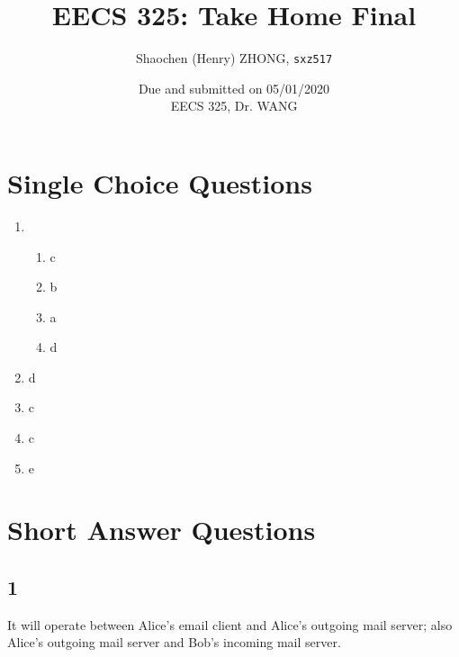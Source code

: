 \documentclass[12pt]{article}
\newcommand{\ilc}{\texttt}
\begin{document}
\title{\textbf{EECS 325: Take Home Final}}

\author{Shaochen (Henry) ZHONG, \ilc{sxz517} }
\date{Due and submitted on 05/01/2020 \\ EECS 325, Dr. WANG}
\maketitle

\section{Single Choice Questions}


\begin{enumerate}
    \item
    \begin{enumerate}[label=(\roman*)]
        \item c
        \item b
        \item a
        \item d
    \end{enumerate}
    \item d
    \item c
    \item c
    \item e
\end{enumerate}


\section{Short Answer Questions}

\subsection{1}

It will operate between Alice's email client and Alice's outgoing mail server; also Alice's outgoing mail server and Bob's incoming mail server.

\end{document}
